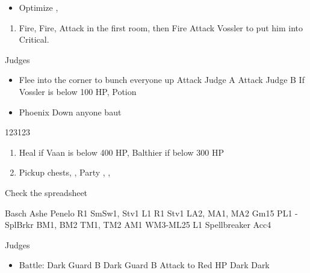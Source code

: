 \begin{equip}
\begin{itemize}
\item Optimize \basch, \vaan
\end{itemize}
\end{equip}
\begin{enumerate}
\item Fire, Fire, Attack in the first room, then Fire Attack Vossler to put him into Critical.
\end{enumerate}
\begin{battle}{Judges}
\begin{itemize}
\item Flee into the corner to bunch everyone up
\vaanf Attack Judge A
\baschf Attack Judge B
\balthierf If Vossler is below 100 HP, Potion
\item Phoenix Down anyone baut \balthier
\end{itemize}
\end{battle}
\begin{shop}{123123}
\end{shop}
\begin{enumerate}
\item Heal if Vaan is below 400 HP, Balthier if below 300 HP
\item Pickup chests, \leader{\vaan}, Party \vaan, \penelo, \ashe
\end{enumerate}
\begin{liscense}
Check the spreadsheet

Basch	Ashe	Penelo
R1	SmSw1, Stv1	L1
	R1	Stv1
		LA2, MA1, MA2
		Gm15
		PL1 - SplBrkr
		BM1, BM2
		TM1, TM2
		AM1
	WM3-ML25	L1
	Spellbreaker	
	Acc4	
\end{liscense}
\begin{battle}{Judges}
\begin{itemize}
\vaanf Reflect \ashe
\ashef Heal \vaan
\penelof Reflect \penelo
\vaanf Reflect \vaan
\item Battle:
\vaanf Dark Guard B
\penelof Dark Guard B
\ashef Attack \penelo to Red HP
\vaanf Dark \penelo
\penelof Dark \penelo
\end{itemize}
\end{battle}